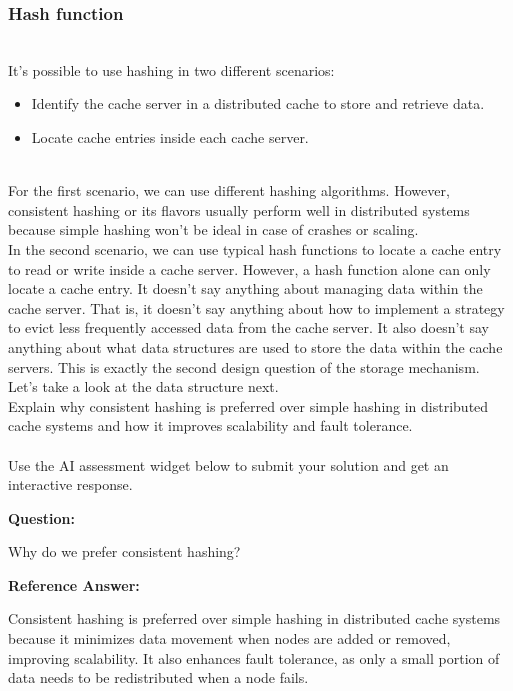 \subsubsection{Hash function}\label{uYoSThURzBVM8Qh-Y7yDl}
\\
It's possible to use hashing in two different scenarios:

\begin{itemize}
\item
\protect{}\label{hkbdlrWkEdLmlvWdPDEC0}
Identify the cache server in a distributed cache to store and retrieve data.
\item
\protect{}\label{7EMTE2GCEpB2P1WbMSAvl}
Locate cache entries inside each cache server.
\end{itemize}
\\
For the first scenario, we can use different hashing algorithms. However, consistent hashing or its flavors usually perform well in distributed systems because simple hashing won't be ideal in case of crashes or scaling.
\\
In the second scenario, we can use typical hash functions to locate a cache entry to read or write inside a cache server. However, a hash function alone can only locate a cache entry. It doesn't say anything about managing data within the cache server. That is, it doesn't say anything about how to implement a strategy to evict less frequently accessed data from the cache server. It also doesn't say anything about what data structures are used to store the data within the cache servers. This is exactly the second design question of the storage mechanism. Let's take a look at the data structure next.
\\
Explain why consistent hashing is preferred over simple hashing in distributed cache systems and how it improves scalability and fault tolerance.\\
\\
Use the AI assessment widget below to submit your solution and get an interactive response.

\textbf{Question:}

Why do we prefer consistent hashing?

\textbf{Reference Answer:}

Consistent hashing is preferred over simple hashing in distributed cache systems because it minimizes data movement when nodes are added or removed, improving scalability. It also enhances fault tolerance, as only a small portion of data needs to be redistributed when a node fails.

